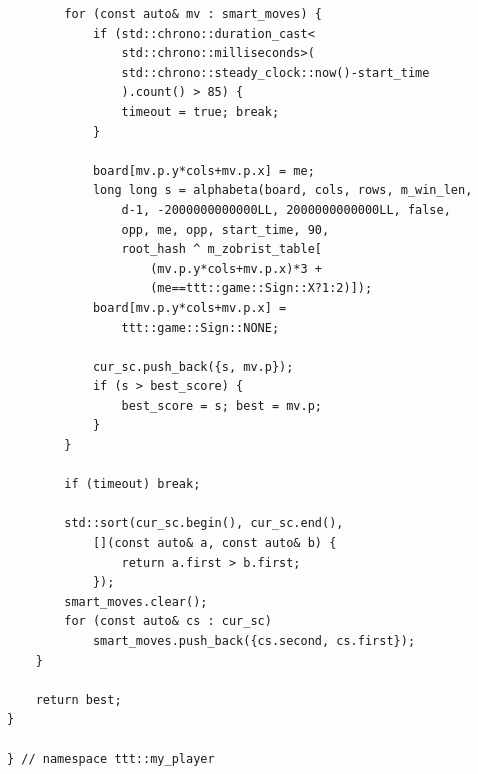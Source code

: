 \documentclass[a4paper,14pt]{extreport}
\begin{document}
\begin{lstlisting}
        for (const auto& mv : smart_moves) {
            if (std::chrono::duration_cast<
                std::chrono::milliseconds>(
                std::chrono::steady_clock::now()-start_time
                ).count() > 85) { 
                timeout = true; break; 
            }
            
            board[mv.p.y*cols+mv.p.x] = me;
            long long s = alphabeta(board, cols, rows, m_win_len, 
                d-1, -2000000000000LL, 2000000000000LL, false, 
                opp, me, opp, start_time, 90, 
                root_hash ^ m_zobrist_table[
                    (mv.p.y*cols+mv.p.x)*3 + 
                    (me==ttt::game::Sign::X?1:2)]);
            board[mv.p.y*cols+mv.p.x] = 
                ttt::game::Sign::NONE;
            
            cur_sc.push_back({s, mv.p});
            if (s > best_score) { 
                best_score = s; best = mv.p; 
            }
        }
        
        if (timeout) break;
        
        std::sort(cur_sc.begin(), cur_sc.end(), 
            [](const auto& a, const auto& b) { 
                return a.first > b.first; 
            });
        smart_moves.clear(); 
        for (const auto& cs : cur_sc) 
            smart_moves.push_back({cs.second, cs.first});
    }
    
    return best;
}

} // namespace ttt::my_player
\end{lstlisting}
\end{document}
